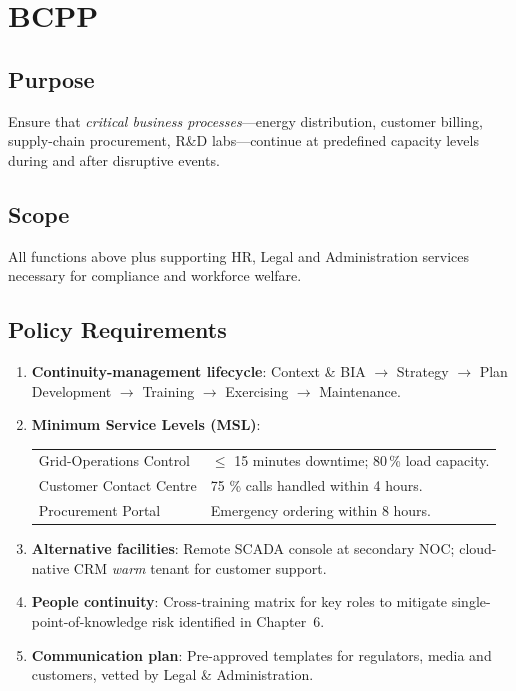 \section{\ac{BCPP}}
\label{sec:BCPP}
\subsection*{Purpose}
Ensure that \emph{critical business processes}—energy distribution,
customer billing, supply-chain procurement, R\&D labs—continue at predefined
capacity levels during and after disruptive events.

\subsection*{Scope}
All functions above plus supporting HR, Legal and Administration services
necessary for compliance and workforce welfare.

\subsection*{Policy Requirements}
\begin{enumerate}[label=\arabic*.]
  \item \textbf{Continuity-management lifecycle}: Context \& BIA
        $\rightarrow$ Strategy $\rightarrow$ Plan Development
        $\rightarrow$ Training $\rightarrow$ Exercising
        $\rightarrow$ Maintenance.
  \item \textbf{Minimum Service Levels (MSL)}: \\
        \begin{tabular}{@{}l l@{}}
        Grid-Operations Control & $\le$ 15 minutes downtime; 80\,\% load
        capacity.\\
        Customer Contact Centre & 75 \% calls handled within 4 hours.\\
        Procurement Portal & Emergency ordering within 8 hours.\\
        \end{tabular}
  \item \textbf{Alternative facilities}: Remote SCADA console at secondary
        NOC; cloud-native CRM \emph{warm} tenant for customer support.
  \item \textbf{People continuity}: Cross-training matrix for key roles to
        mitigate single-point-of-knowledge risk identified in
        Chapter~6.
  \item \textbf{Communication plan}: Pre-approved templates for regulators,
        media and customers, vetted by Legal \& Administration.
\end{enumerate}

